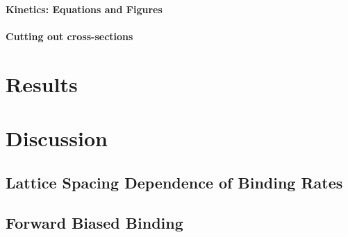 \documentclass[]{article}
\begin{document}
\paragraph*{Kinetics: Equations and Figures}
\paragraph*{Cutting out cross-sections}



\section*{Results}




\section*{Discussion}



\subsection*{Lattice Spacing Dependence of Binding Rates}




\subsection*{Forward Biased Binding}



\end{document}
